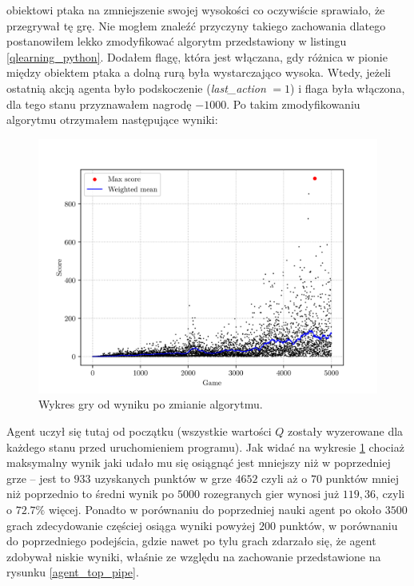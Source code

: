 \documentclass[a4paper, 12pt,oneside]{book}
\begin{document}
obiektowi ptaka na zmniejszenie swojej wysokości co oczywiście sprawiało,
że przegrywał tę grę. Nie mogłem znaleźć przyczyny takiego zachowania dlatego
postanowiłem lekko zmodyfikować algorytm przedstawiony w listingu
\ref{qlearning_python}. Dodałem flagę, która jest włączana, gdy różnica w
pionie między obiektem ptaka a dolną rurą była wystarczająco wysoka. Wtedy,
jeżeli ostatnią akcją agenta było podskoczenie (\textit{last\_action}
$=1$) i flaga była włączona, dla tego stanu przyznawałem nagrodę $-1000$. Po
takim zmodyfikowaniu algorytmu otrzymałem następujące wyniki:
\begin{figure}[!htb]
	\begin{center}
		\includegraphics{plotTopPipeDeathPenalty.png}
	\end{center}
	\caption{Wykres gry od wyniku po zmianie algorytmu.}
	\label{plot_top_pipe_penalty}
\end{figure}

Agent uczył się tutaj od początku (wszystkie wartości $Q$ zostały wyzerowane
dla każdego stanu przed uruchomieniem programu).
Jak widać na wykresie \ref{plot_top_pipe_penalty} chociaż maksymalny wynik jaki 
udało mu się osiągnąć jest mniejszy niż w poprzedniej grze -- jest to $933$
uzyskanych punktów w grze $4652$ czyli aż o $70$ punktów mniej niż poprzednio
to średni wynik po $5000$ rozegranych gier wynosi już $119,36$, czyli o 
$72.7\%$ więcej. Ponadto w porównaniu do poprzedniej nauki agent po około
$3500$ grach zdecydowanie częściej osiąga wyniki powyżej $200$ punktów, w
porównaniu do poprzedniego podejścia, gdzie nawet po tylu grach zdarzało się,
że agent zdobywał niskie wyniki, właśnie ze względu na zachowanie przedstawione
na rysunku \ref{agent_top_pipe}.
\end{document}
